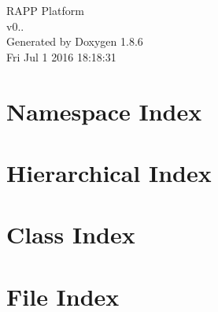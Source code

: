 \documentclass[twoside]{book}
\newcommand{\clearemptydoublepage}{%
  \newpage{\pagestyle{empty}\cleardoublepage}%
}
\begin{document}
\hypersetup{pageanchor=false}
\begin{titlepage}
\vspace*{7cm}
\begin{center}%
{\Large R\-A\-P\-P Platform \\[1ex]\large v0.. }\\
\vspace*{1cm}
{\large Generated by Doxygen 1.8.6}\\
\vspace*{0.5cm}
{\small Fri Jul 1 2016 18:18:31}\\
\end{center}
\end{titlepage}
\clearemptydoublepage
\tableofcontents
\clearemptydoublepage
{}
\hypersetup{pageanchor=true}

\chapter{Namespace Index}

\chapter{Hierarchical Index}

\chapter{Class Index}

\chapter{File Index}

\end{document}
